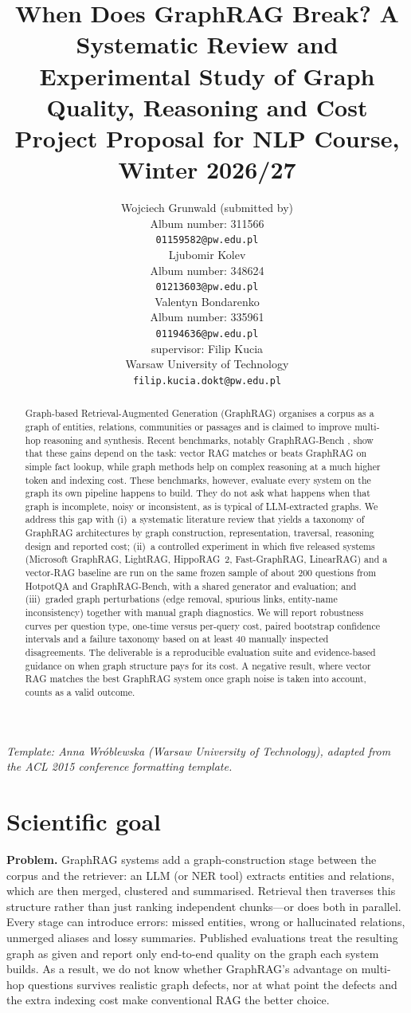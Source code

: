 \documentclass[11pt]{article}
\title{When Does GraphRAG Break? A Systematic Review and Experimental Study of Graph Quality, Reasoning and Cost\\Project Proposal for NLP Course, Winter 2026/27}
\author{Wojciech Grunwald (submitted by) \\
  Album number: 311566 \\
  {\tt 01159582@pw.edu.pl} \\\And
  Ljubomir Kolev \\
  Album number: 348624\\
  {\tt 01213603@pw.edu.pl} \\ \And
  Valentyn Bondarenko \\
  Album number: 335961\\
  {\tt 01194636@pw.edu.pl} \\ \AND
  supervisor: Filip Kucia\\
  Warsaw University of Technology \\
  {\tt filip.kucia.dokt@pw.edu.pl}}
\date{}
\begin{document}
\maketitle

{\small\em Template: Anna Wróblewska (Warsaw University of Technology), adapted from the ACL 2015 conference formatting template.}
\vspace{4pt}

\begin{abstract}
Graph-based Retrieval-Augmented Generation (GraphRAG) organises a corpus as a graph of entities, relations, communities or passages and is claimed to improve multi-hop reasoning and synthesis. Recent benchmarks, notably GraphRAG-Bench \cite{xiang2026when}, show that these gains depend on the task: vector RAG matches or beats GraphRAG on simple fact lookup, while graph methods help on complex reasoning at a much higher token and indexing cost. These benchmarks, however, evaluate every system on the graph its own pipeline happens to build. They do not ask what happens when that graph is incomplete, noisy or inconsistent, as is typical of LLM-extracted graphs. We address this gap with (i)~a systematic literature review that yields a taxonomy of GraphRAG architectures by graph construction, representation, traversal, reasoning design and reported cost; (ii)~a controlled experiment in which five released systems (Microsoft GraphRAG, LightRAG, HippoRAG~2, Fast-GraphRAG, LinearRAG) and a vector-RAG baseline are run on the same frozen sample of about 200 questions from HotpotQA and GraphRAG-Bench, with a shared generator and evaluation; and (iii)~graded graph perturbations (edge removal, spurious links, entity-name inconsistency) together with manual graph diagnostics. We will report robustness curves per question type, one-time versus per-query cost, paired bootstrap confidence intervals and a failure taxonomy based on at least 40 manually inspected disagreements. The deliverable is a reproducible evaluation suite and evidence-based guidance on when graph structure pays for its cost. A negative result, where vector RAG matches the best GraphRAG system once graph noise is taken into account, counts as a valid outcome.
\end{abstract}

\section{Scientific goal}
\label{sec:goal}

\textbf{Problem.} GraphRAG systems add a graph-construction stage between the corpus and the retriever: an LLM (or NER tool) extracts entities and relations, which are then merged, clustered and summarised. Retrieval then traverses this structure rather than just ranking independent chunks—or does both in parallel. Every stage can introduce errors: missed entities, wrong or hallucinated relations, unmerged aliases and lossy summaries. Published evaluations treat the resulting graph as given and report only end-to-end quality on the graph each system builds. As a result, we do not know whether GraphRAG's advantage on multi-hop questions survives realistic graph defects, nor at what point the defects and the extra indexing cost make conventional RAG the better choice.
\end{document}
